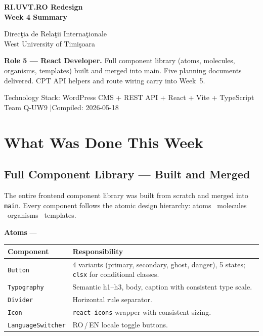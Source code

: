 \documentclass[12pt,a4paper]{article}
\begin{document}
\color{textGray}

\begin{titlepage}
\pagecolor{uvtDarkBlue}\color{white}
\vspace*{2cm}
{\Huge\bfseries RI.UVT.RO Redesign\\[0.35em]
Week 4 Summary\par}
\vspace{0.8cm}
{\Large Direc\c{t}ia de Rela\c{t}ii Interna\c{t}ionale\\
West University of Timi\c{s}oara\par}
\vspace{1.5cm}
\begin{yellowbox}
\color{textGray}
\textbf{Role 5 --- React Developer.}
Full component library (atoms, molecules, organisms, templates) built and
merged into main. Five planning documents delivered.
CPT API helpers and route wiring carry into Week~5.
\end{yellowbox}
\vfill
{\large Technology Stack: WordPress CMS + REST API + React + Vite + TypeScript\\[4pt]
Team Q-UW9 \quad|\quad Compiled: 2026-05-18}
\vspace{1cm}
\end{titlepage}
\nopagecolor\color{textGray}

\section{What Was Done This Week}

\subsection{Full Component Library --- Built and Merged}

The entire frontend component library was built from scratch and merged into
\texttt{main}. Every component follows the atomic design hierarchy:
atoms \textrightarrow\ molecules \textrightarrow\ organisms \textrightarrow\
templates.

\vspace{0.8em}
\noindent\textbf{Atoms} --- 
\vspace{0.4em}

\begin{longtable}{@{}L{3.6cm}L{9.6cm}@{}}
\toprule
{}
\textbf{Component} & \textbf{Responsibility} \\
\midrule
\endhead
\texttt{Button}
    & 4 variants (primary, secondary, ghost, danger), 5 states;
      \texttt{clsx} for conditional classes. \\
\addlinespace
\texttt{Typography}
    & Semantic h1--h3, body, caption with consistent type scale. \\
\addlinespace
\texttt{Divider} & Horizontal rule separator. \\
\addlinespace
\texttt{Icon} & \texttt{react-icons} wrapper with consistent sizing. \\
\addlinespace
\texttt{LanguageSwitcher} & RO\,/\,EN locale toggle buttons. \\
\bottomrule
\end{longtable}
\end{document}
